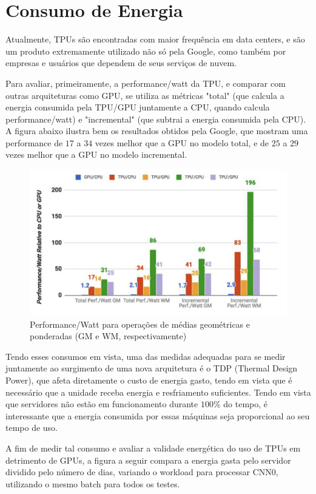 \documentclass{report}
\begin{document}
\chapter{Consumo de Energia}

Atualmente, TPUs são encontradas com maior frequência em data centers, e são um produto extremamente utilizado não só pela Google, como também por empresas e usuários que dependem de seus serviços de nuvem.

Para avaliar, primeiramente, a performance/watt da TPU, e comparar com outras arquiteturas como GPU, se utiliza as métricas "total" (que calcula a energia consumida pela TPU/GPU juntamente a CPU, quando calcula performance/watt) e "incremental" (que subtrai a energia consumida pela CPU). A figura abaixo ilustra bem os resultados obtidos pela Google, que mostram uma performance de $17$ a $34$ vezes melhor que a GPU no modelo total, e de $25$ a $29$ vezes melhor que a GPU no modelo incremental.

\begin{figure}[h]
	\includegraphics[scale=0.5]{performance-watt}
	\centering
	\caption{Performance/Watt para operações de médias geométricas e ponderadas (GM e WM, respectivamente)}
\end{figure}

Tendo esses consumos em vista, uma das medidas adequadas para se medir juntamente ao surgimento de uma nova arquitetura é o TDP (Thermal Design Power), que afeta diretamente o custo de energia gasto, tendo em vista que é necessário que a unidade receba energia e resfriamento suficientes. Tendo em vista que servidores não estão em funcionamento durante $100\%$ do tempo, é interessante que a energia consumida por essas máquinas seja proporcional ao seu tempo de uso.

A fim de medir tal consumo e avaliar a validade energética do uso de TPUs em detrimento de GPUs, a figura a seguir compara a energia gasta pelo servidor dividido pelo número de dias, variando o workload para processar CNN0, utilizando o mesmo batch para todos os testes.
\end{document}
